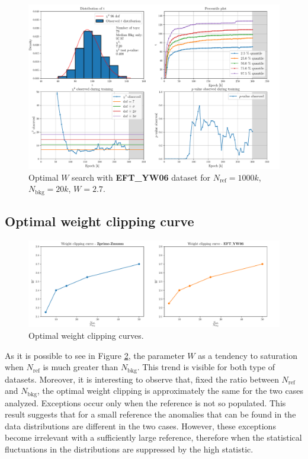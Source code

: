 \begin{figure}[H]
	\centering
	\includegraphics[width=1.0\textwidth]{Python/W_CLIP/ref1000000_bkg20000_sig0/data_ref1000000_bkg20000_sig0_wclip2-7.pdf}
	\caption{Optimal $W$ search with \textbf{EFT\_YW06} dataset for $N_\mathrm{ref}=1000\si{k}$, $N_\mathrm{bkg}=20\si{k}$, $W=2.7$.}
	\label{fig:REF1000000_BKG20000_EFT0_WCLIP2.7}
\end{figure}





\subsection*{Optimal weight clipping curve}
\vspace{-5mm}
\begin{figure}[H]
	\centering
	\includegraphics[width=1.0\textwidth]{Python/W_CLIP/W_CLIP_CURVE/w_clip_curve.pdf}
	\caption{Optimal weight clipping curves.}
	\label{fig:W_CLIP_CURVE}
\end{figure}

As it is possible to see in Figure \ref{fig:W_CLIP_CURVE}, the parameter $W$ as a tendency to saturation when $N_\mathrm{ref}$ is much greater than $N_\mathrm{bkg}$. This trend is visible for both type of datasets. Moreover, it is interesting to observe that, fixed the ratio between $N_\mathrm{ref}$ and $N_\mathrm{bkg}$, the optimal weight clipping is approximately the same for the two cases analyzed. Exceptions occur only when the reference is not so populated. This result suggests that for a small reference the anomalies that can be found in the data distributions are different in the two cases. However, these exceptions become irrelevant with a sufficiently large reference, therefore when the statistical fluctuations in the distributions are suppressed by the high statistic.

